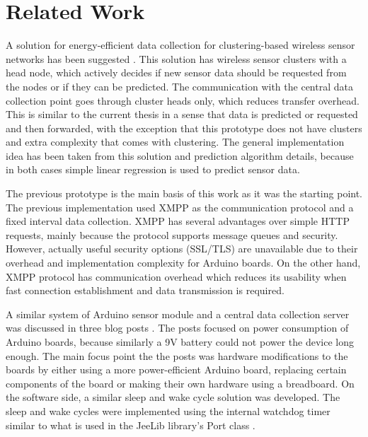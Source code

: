 

\chapter{Related Work} %

A solution for energy-efficient data collection for clustering-based wireless sensor networks has been suggested \cite{cluster_wsn_paper}. This solution has wireless sensor clusters with a head node, which actively decides if new sensor data should be requested from the nodes or if they can be predicted. The communication with the central data collection point goes through cluster heads only, which reduces transfer overhead. This is similar to the current thesis in a sense that data is predicted or requested and then forwarded, with the exception that this prototype does not have clusters and extra complexity that comes with clustering. 
The general implementation idea has been taken from this solution and prediction algorithm details, because in both cases simple linear regression is used to predict sensor data. 


The previous prototype \cite{prev_thesis} is the main basis of this work as it was the starting point. The previous implementation used XMPP as the communication protocol and a fixed interval data collection. XMPP has several advantages over simple HTTP requests, mainly because the protocol supports message queues and security. However, actually useful security options (SSL/TLS) are unavailable due to their overhead and implementation complexity for Arduino boards. On the other hand, XMPP protocol has communication overhead which reduces its usability when fast connection establishment and data transmission is required.

A similar system of Arduino sensor module and a central data collection server was discussed in three blog posts \cite{arduino_blog_1,arduino_blog_2,arduino_blog_3}. The posts focused on power consumption of Arduino boards, because similarly a 9V battery could not power the device long enough. The main focus point the the posts was hardware modifications to the boards by either using a more power-efficient Arduino board,  replacing certain components of the board or making their own hardware using a breadboard. On the software side, a similar sleep and wake cycle solution was developed. The sleep and wake cycles were implemented using the internal watchdog timer similar to what is used in the JeeLib library's Port class \cite{jeelib_port}.



